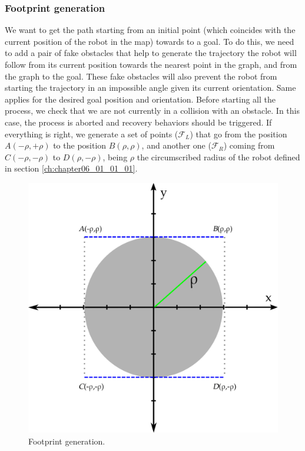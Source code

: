 \subsubsection{Footprint generation}\label{ch:chapter06_01_02_02}

We want to get the path starting from an initial point (which coincides with the current position of the robot in the map) towards to a goal. To do this, we need to add a pair of fake obstacles that help to generate the trajectory the robot will follow from its current position towards the nearest point in the graph, and from the graph to the goal. These fake obstacles will also prevent the robot from starting the trajectory in an impossible angle given its current orientation. Same applies for the desired goal position and orientation. Before starting all the process, we check that we are not currently in a collision with an obstacle. In this case, the process is aborted and recovery behaviors should be triggered. If everything is right, we generate a set of points ($\mathcal{F}_L$) that go from the position $A(-\rho, +\rho)$ to the position $B(\rho, \rho)$, and another one ($\mathcal{F}_R$) coming from $C(-\rho, -\rho)$ to $D(\rho, -\rho)$, being $\rho$ the circumscribed radius of the robot defined in section \ref{ch:chapter06_01_01_01}. 

\begin{figure}[h!]
  \centering
  \includegraphics[width=\textwidth, trim=0 0 0 0,clip]{figure5}
  \caption{Footprint generation.}
  \label{fig:cp06_footprint_generation}
\end{figure}%

